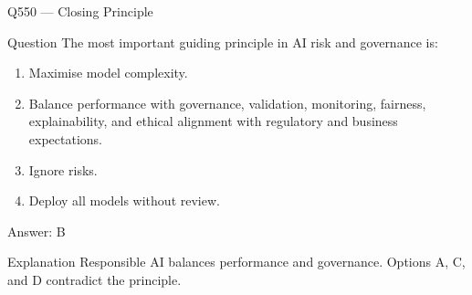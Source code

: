 \documentclass[aspectratio=169,8pt]{beamer}
\begin{document}
	\begin{frame}{Q550 --- Closing Principle}
		\begin{block}{Question}
			The most important guiding principle in AI risk and governance is:
			\begin{enumerate}
				\item Maximise model complexity.
				\item Balance performance with governance, validation, monitoring, fairness, explainability, and ethical alignment with regulatory and business expectations.
				\item Ignore risks.
				\item Deploy all models without review.
			\end{enumerate}
		\end{block}
		\begin{exampleblock}{Answer: B}\end{exampleblock}
		\begin{block}{Explanation}
			Responsible AI balances performance and governance. Options A, C, and D contradict the principle.
		\end{block}
	\end{frame}
	
\end{document}
